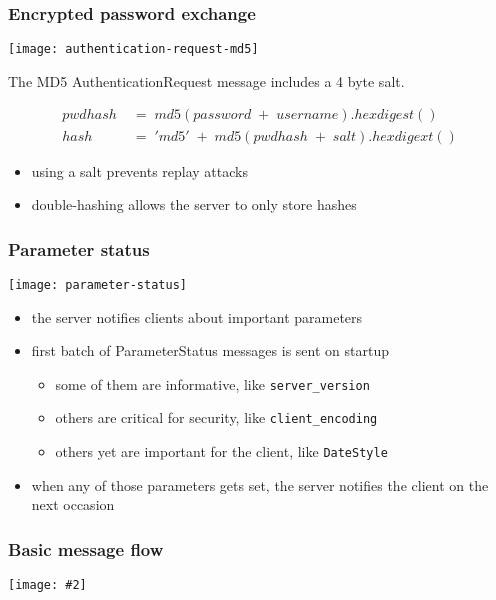 \documentclass{beamer}
\newcommand{\mscdiagram}[2][1]{
  \begin{center}
    \texttt{[image: \#2]}
  \end{center}
}
\begin{document}
\begin{frame}
  \frametitle{Encrypted password exchange}

  \begin{center}
    \texttt{[image: authentication-request-md5]}
  \end{center}

  The MD5 AuthenticationRequest message includes a 4 byte salt.

  \begin{align*}
    pwdhash\;&=\;md5(password\;+\;username).hexdigest() \\
    hash\;&=\;'md5'\;+\;md5(pwdhash\;+\;salt).hexdigext()
  \end{align*}

  \begin{itemize}
  \item using a salt prevents replay attacks
  \item double-hashing allows the server to only store hashes
  \end{itemize}
\end{frame}

\begin{frame}
  \frametitle{Parameter status}

  \begin{center}
    \texttt{[image: parameter-status]}
  \end{center}

  \begin{itemize}
  \item the server notifies clients about important parameters
  \item first batch of ParameterStatus messages is sent on startup
    \begin{itemize}
    \item some of them are informative, like \texttt{server\_version}
    \item others are critical for security, like \texttt{client\_encoding}
    \item others yet are important for the client, like \texttt{DateStyle}
    \end{itemize}
  \item when any of those parameters gets set, the server notifies the client
    on the next occasion
  \end{itemize}
\end{frame}

\begin{frame}
  \frametitle{Basic message flow}

  \mscdiagram{basic-message-flow}
\end{frame}
\end{document}
